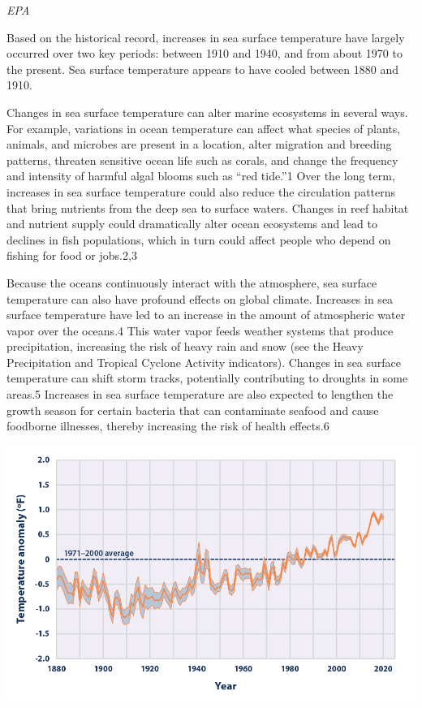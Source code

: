 \documentclass[
]{book}
\begin{document}
\emph{EPA}

Based on the historical record, increases in sea surface temperature have largely occurred over two key periods: between 1910 and 1940, and from about 1970 to the present. Sea surface temperature appears to have cooled between 1880 and 1910.

Changes in sea surface temperature can alter marine ecosystems in several ways. For example, variations in ocean temperature can affect what species of plants, animals, and microbes are present in a location, alter migration and breeding patterns, threaten sensitive ocean life such as corals, and change the frequency and intensity of harmful algal blooms such as ``red tide.''1 Over the long term, increases in sea surface temperature could also reduce the circulation patterns that bring nutrients from the deep sea to surface waters. Changes in reef habitat and nutrient supply could dramatically alter ocean ecosystems and lead to declines in fish populations, which in turn could affect people who depend on fishing for food or jobs.2,3

Because the oceans continuously interact with the atmosphere, sea surface temperature can also have profound effects on global climate. Increases in sea surface temperature have led to an increase in the amount of atmospheric water vapor over the oceans.4 This water vapor feeds weather systems that produce precipitation, increasing the risk of heavy rain and snow (see the Heavy Precipitation and Tropical Cyclone Activity indicators). Changes in sea surface temperature can shift storm tracks, potentially contributing to droughts in some areas.5 Increases in sea surface temperature are also expected to lengthen the growth season for certain bacteria that can contaminate seafood and cause foodborne illnesses, thereby increasing the risk of health effects.6

\includegraphics{fig/sea_surface_tmp_2.png}
\end{document}
